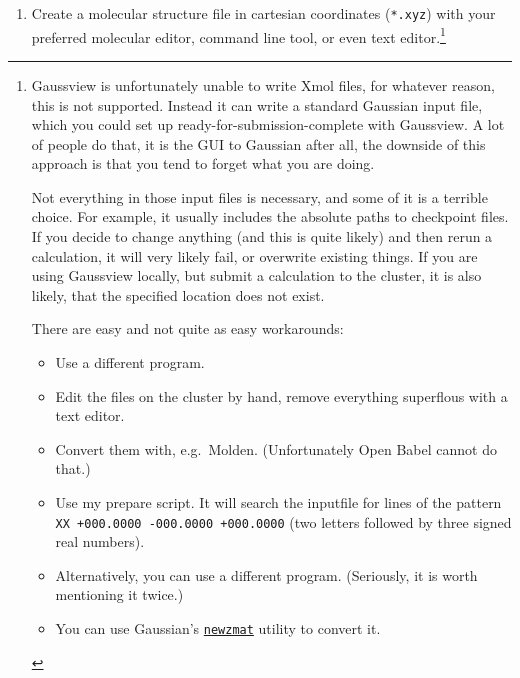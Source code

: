 \documentclass[   %
  final,          %
  a4paper         %
]{article}
\begin{document}
\begin{enumerate}
\item
  Create a molecular structure file in cartesian coordinates
  (\texttt{*.xyz}) with your preferred molecular editor, command line
  tool, or even text editor.\footnote{%
    Gaussview is unfortunately unable to write Xmol files, for whatever
    reason, this is not supported. Instead it can write a standard Gaussian
    input file, which you could set up ready-for-submission-complete with
    Gaussview. A lot of people do that, it is the GUI to Gaussian after all,
    the downside of this approach is that you tend to forget what you are
    doing.
    
    Not everything in those input files is necessary, and some of it is a
    terrible choice. For example, it usually includes the absolute paths to
    checkpoint files. If you decide to change anything (and this is quite
    likely) and then rerun a calculation, it will very likely fail, or
    overwrite existing things. If you are using Gaussview locally, but
    submit a calculation to the cluster, it is also likely, that the
    specified location does not exist.
    
    There are easy and not quite as easy workarounds:
    
    \begin{itemize}
    \item
      Use a different program.
    \item
      Edit the files on the cluster by hand, remove everything superflous
      with a text editor.
    \item
      Convert them with, e.g.~Molden. (Unfortunately Open Babel cannot do
      that.)
    \item
      Use my prepare script. It will search the inputfile for lines of the
      pattern \texttt{XX  +000.0000  -000.0000  +000.0000}
      (two letters followed by three signed real numbers).
    \item
      Alternatively, you can use a different program. (Seriously, it is
      worth mentioning it twice.)
    \item
      You can use Gaussian's \href{http://gaussian.com/newzmat/}{\texttt{newzmat}}
      utility to convert it.
    \end{itemize}
  }


\end{enumerate}
\end{document}
